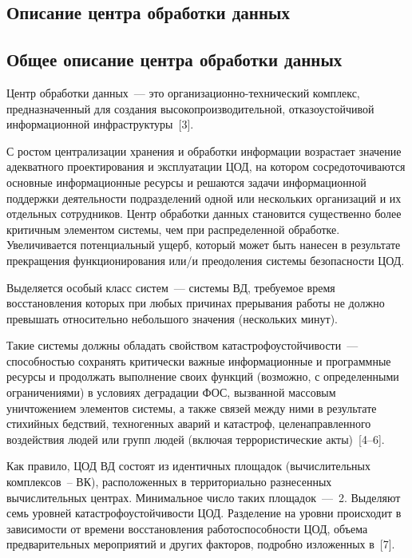 \begin{multicols}{2}
\vspace*{-6pt}

\section{Описание центра обработки данных}

\vspace*{-2pt}

\subsection{Общее описание центра обработки данных}
       
       Центр обработки данных~--- это ор\-га\-ни\-за\-ци\-он\-но-тех\-ни\-че\-ский 
       комплекс, предназначенный для 
создания высокопроизводительной, отказоустойчивой информационной 
инфраструктуры~[3].
       
       С ростом централизации хранения и обработки информации возрастает значение 
адекватного проектирования и эксплуатации ЦОД, на котором сосредоточиваются 
основные информационные ресурсы и решаются задачи информационной поддержки 
деятельности подразделений одной или нескольких организаций и их отдельных 
сотрудников. Центр обработки данных становится существенно более критичным элементом сис\-те\-мы, чем 
при распределенной обработке. Увеличивается потенциальный ущерб, который может 
быть нанесен в результате прекращения функционирования или/и преодоления сис\-те\-мы 
безопасности ЦОД. 
       
       Выделяется особый класс сис\-тем~--- сис\-те\-мы ВД, 
требуемое время вос\-ста\-нов\-ле\-ния которых при любых причинах прерывания работы не 
должно превышать относительно небольшого значения (нескольких минут). 

Такие 
сис\-те\-мы должны \mbox{обладать} свойством ка\-та\-ст\-ро\-фо\-устой\-чи\-вости~--- спо\-соб\-ностью 
сохранять критически важные информационные и програм\-мные ресурсы и продолжать 
выполнение своих функ\-ций (возможно, с определенными ограничениями) в условиях 
деградации ФОС, вызванной массовым 
уничтожением элементов сис\-те\-мы, а также связей между ними в результате стихийных 
бедствий, техногенных аварий и катастроф, целенаправленного воздействия людей или 
групп людей (включая террористические акты)~[4--6]. 
       
       Как правило, ЦОД ВД состоят из идентичных площадок (вычислительных 
комплексов~-- ВК), расположенных в территориально разнесенных вычислительных 
центрах. Минимальное число таких площадок~---~2. Выделяют семь уровней 
катастрофоустойчивости ЦОД. Разделение на уровни происходит в зависимости от 
времени восстановления работоспособности ЦОД, объема предварительных мероприятий 
и других факторов, подробно изложенных в~[7].
       

\end{multicols}
